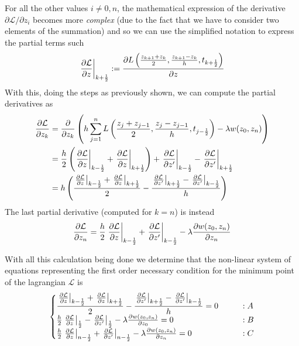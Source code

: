 For all the other values $i\neq0,n$, the mathematical expression of the derivative $\partial\mathcal L   / \partial z_i$ becomes more \textit{complex} (due to the fact that we have to consider two elements of the summation) and so we can use the simplified notation to express the partial terms such
\[ \left. \frac{\partial \mathcal L  }{\partial z} \right|_{k + \frac 1 2} :=  \frac{\partial L \left( \frac{z_{k+1}+z_k}2, \frac{z_{k+1}-z_k}h, t_{k+\frac 1 2} \right)}{\partial z} \]
With this, doing the steps as previously shown, we can compute the partial derivatives as
\begin{align*}
	\frac{\partial \mathcal L  }{\partial z_k} &= \frac{\partial }{\partial z_k} \left(h \sum_{j=1}^{n} L  \left(\frac{z_j + z_{j-1}}{2},  \frac{z_j - z_{j-1}}{h}  , t_{j-\frac 1 2}   \right) - \lambda w(z_0,z_n) \right) \\
	& = \frac h 2 \left( \left. \frac{\partial \mathcal L  }{\partial z} \right|_{k - \frac 1 2} + \left. \frac{\partial \mathcal L  }{\partial z} \right|_{k + \frac 1 2}  \right) + \left. \frac{\partial \mathcal L  }{\partial z'} \right|_{k - \frac 1 2} - \left. \frac{\partial \mathcal L  }{\partial z'} \right|_{k + \frac 1 2} \\
	& = h \left(  \frac{\left. \frac{\partial \mathcal L  }{\partial z} \right|_{k - \frac 1 2} + \left. \frac{\partial \mathcal L  }{\partial z} \right|_{k + \frac 1 2}}{2} - \frac{\left. \frac{\partial \mathcal L  }{\partial z'} \right|_{k + \frac 1 2} - \left. \frac{\partial \mathcal L  }{\partial z'} \right|_{k - \frac 1 2}}{h} \right)
\end{align*}	
The last partial derivative (computed for $k=n$) is instead
\[ \frac{\partial \mathcal L  }{\partial z_n} = \frac h 2 \left. \frac{\partial \mathcal L  }{\partial z} \right|_{k - \frac 1 2} + \left. \frac{\partial \mathcal L  }{\partial z'} \right|_{k - \frac 1 2} - \lambda \frac{\partial w(z_0,z_n)}{\partial z_n}\]

With all this calculation being done we determine that the non-linear system of equations representing the first order necessary condition for the minimum point of the lagrangian $\mathcal L  $ is
\[\begin{cases}
	\dfrac{\left. \frac{\partial \mathcal L  }{\partial z} \right|_{k - \frac 1 2} + \left. \frac{\partial \mathcal L  }{\partial z} \right|_{k + \frac 1 2}}{2} - \dfrac{\left. \frac{\partial \mathcal L  }{\partial z'} \right|_{k + \frac 1 2} - \left. \frac{\partial \mathcal L  }{\partial z'} \right|_{k - \frac 1 2}}{h} = 0 \qquad & : A  \\
	\frac h 2 \left. \frac{\partial \mathcal L  }{\partial z} \right|_{\frac 1 2} - \left. \frac{\partial \mathcal L  }{\partial z'} \right|_{\frac 1 2} - \lambda \frac{\partial w(z_0,z_n)}{\partial z_0} = 0&:B\\
	\frac h 2 \left. \frac{\partial \mathcal L  }{\partial z} \right|_{n-\frac 1 2} + \left. \frac{\partial \mathcal L  }{\partial z'} \right|_{n-\frac 1 2} - \lambda \frac{\partial w(z_0,z_n)}{\partial z_n} = 0 &:C
\end{cases}\]

